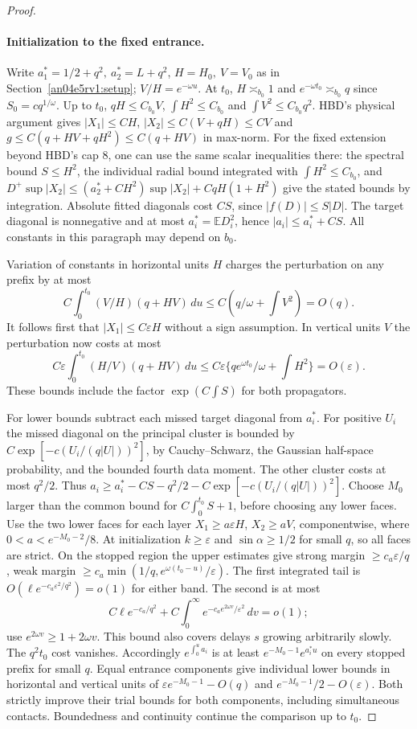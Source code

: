 \documentclass[11pt]{article}
\newcommand{\E}{\mathbb E}
\newcommand{\eps}{\varepsilon}
\begin{document}
\begin{proof}
\paragraph{Initialization to the fixed entrance.}
Write $a_1^*=1/2+q^2,\ a_2^*=L+q^2$, $H=H_0,\ V=V_0$ as in Section~\ref{an04e5rv1:setup}; $V/H=e^{-\omega u}$. At $t_0$, $H\asymp_{b_0}1$ and $e^{-\omega t_0}\asymp_{b_0}q$ since $S_0=cq^{1/\omega}$. Up to $t_0$, $qH\le C_{b_0}V$, $\int H^2\le C_{b_0}$ and $\int V^2\le C_{b_0}q^2$. HBD's physical argument gives $|X_1|\le C H$, $|X_2|\le C(V+qH)\le C V$ and $g\le C(q+HV+qH^2)\le C(q+HV)$ in max-norm. For the fixed extension beyond HBD's cap $8$, one can use the same scalar inequalities there: the spectral bound $S\le H^2$, the individual radial bound integrated with $\int H^2\le C_{b_0}$, and $D^+\sup|X_2|\le(a_2^*+CH^2)\sup|X_2|+CqH(1+H^2)$ give the stated bounds by integration. Absolute fitted diagonals cost $C S$, since $|f(D)|\le S|D|$. The target diagonal is nonnegative and at most $a_i^*=\E D_i^2$, hence $|a_i|\le a_i^*+CS$. All constants in this paragraph may depend on $b_0$.

Variation of constants in horizontal units $H$ charges the perturbation on any prefix by at most
\[
 C\int_0^{t_0}(V/H)(q+HV)\,du\le C(q/\omega+\int V^2)=O(q).
\]
It follows first that $|X_1|\le C\eps H$ without a sign assumption. In vertical units $V$ the perturbation now costs at most
\[
 C\eps\int_0^{t_0}(H/V)(q+HV)\,du
 \le C\eps\{q e^{\omega t_0}/\omega+\int H^2\}=O(\eps).
\]
These bounds include the factor $\exp(C\int S)$ for both propagators.

For lower bounds subtract each missed target diagonal from $a_i^*$. For positive $U_i$ the missed diagonal on the principal cluster is bounded by $C\exp[-c(U_i/(q|U|))^2]$, by Cauchy--Schwarz, the Gaussian half-space probability, and the bounded fourth data moment. The other cluster costs at most $q^2/2$. Thus
$a_i\ge a_i^*-CS-q^2/2-C\exp[-c(U_i/(q|U|))^2]$.
Choose $M_0$ larger than the common bound for $C\int_0^{t_0}S+1$, before choosing any lower faces. Use the two lower faces for each layer $X_1\ge a\eps H$, $X_2\ge a V$, componentwise, where $0<a<e^{-M_0-2}/8$. At initialization $k\ge\eps$ and $\sin\alpha\ge1/2$ for small $q$, so all faces are strict. On the stopped region the upper estimates give strong margin $\ge c_a\eps/q$, weak margin
$\ge c_a\min(1/q,e^{\omega(t_0-u)}/\eps)$. The first integrated tail is $O(\ell e^{-c_a\eps^2/q^2})=o(1)$ for either band. The second is at most
\[
 C\ell e^{-c_a/q^2}
 +C\int_0^\infty e^{-c_a e^{2\omega v}/\eps^2}\,dv=o(1);
\]
use $e^{2\omega v}\ge1+2\omega v$. This bound also covers delays $s$ growing arbitrarily slowly. The $q^2t_0$ cost vanishes. Accordingly $e^{\int_0^u a_i}$ is at least $e^{-M_0-1}e^{a_i^*u}$ on every stopped prefix for small $q$. Equal entrance components give individual lower bounds in horizontal and vertical units of $\eps e^{-M_0-1}-O(q)$ and $e^{-M_0-1}/2-O(\eps)$. Both strictly improve their trial bounds for both components, including simultaneous contacts. Boundedness and continuity continue the comparison up to $t_0$.


\end{proof}
\end{document}
